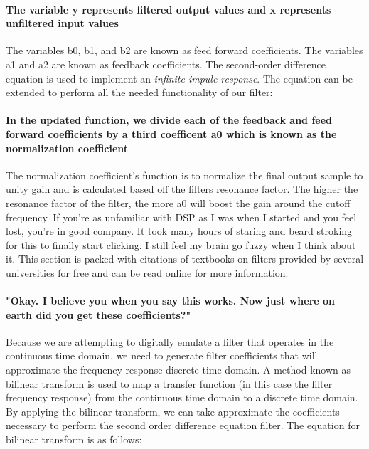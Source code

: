 \documentclass[acmlarge,screen]{acmart}
\begin{document}
	
	\paragraph{The variable y represents filtered output values and x represents unfiltered input values} The variables b0, b1, and b2 are known as feed forward coefficients. The variables a1 and a2 are known as feedback coefficients. The second-order difference equation is used to implement an \textit{infinite impule response}. The equation can be extended to perform all the needed functionality of our filter:
	
	
	\paragraph{In the updated function, we divide each of the feedback and feed forward coefficients by a third coefficent a0 which is known as the normalization coefficient} The normalization coefficient's function is to normalize the final output sample to unity gain and is calculated based off the filters resonance factor. The higher the resonance factor of the filter, the more a0 will boost the gain around the cutoff frequency. If you're as unfamiliar with DSP as I was when I started and you feel lost, you're in good company. It took many hours of staring and beard stroking for this to finally start clicking. I still feel my brain go fuzzy when I think about it. This section is packed with citations of textbooks on filters provided by several universities for free and can be read online for more information. \cite{lacamera_2020}
	
	\paragraph{"Okay. I believe you when you say this works. Now just where on earth did you get these coefficients?"} Because we are attempting to digitally emulate a filter that operates in the continuous time domain, we need to generate filter coefficients that will approximate the frequency response discrete time domain. A method known as bilinear transform is used to map a transfer function (in this case the filter frequency response) from the continuous time domain to a discrete time domain. By applying the bilinear transform, we can take approximate the coefficients necessary to perform the second order difference equation filter. The equation for bilinear transform is as follows: \cite{stanford_2007} 
	
\end{document}
